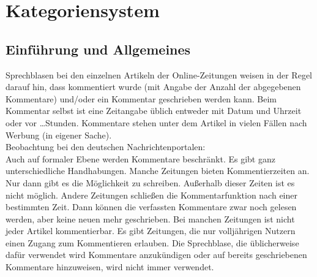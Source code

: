 \chapter{Kategoriensystem}


\section{Einführung und Allgemeines}

Sprechblasen bei den einzelnen Artikeln der Online-Zeitungen weisen in der Regel darauf hin, dass kommentiert wurde
(mit Angabe der Anzahl der abgegebenen Kommentare) und/oder ein Kommentar
geschrieben werden kann.  Beim Kommentar selbst ist eine Zeitangabe üblich
entweder mit Datum und Uhrzeit oder \glqq vor \ldots Stunden\grqq.  Kommentare
stehen unter dem Artikel in vielen Fällen nach Werbung (in eigener Sache).\\
Beobachtung bei den deutschen Nachrichtenportalen:\\
Auch auf formaler Ebene werden Kommentare beschränkt. Es gibt ganz
unterschiedliche Handhabungen. Manche Zeitungen bieten Kommentierzeiten an. Nur
dann gibt es die Möglichkeit zu schreiben. Außerhalb dieser Zeiten ist es nicht
möglich. Andere Zeitungen schließen die Kommentarfunktion nach einer bestimmten
Zeit. Dann können die verfassten Kommentare zwar noch gelesen werden, aber keine
neuen mehr geschrieben. Bei manchen Zeitungen ist nicht jeder Artikel
kommentierbar. Es gibt Zeitungen, die nur volljährigen Nutzern einen Zugang zum
Kommentieren erlauben.  Die Sprechblase, die üblicherweise dafür verwendet wird
Kommentare anzukündigen oder auf bereits geschriebenen Kommentare hinzuweisen,
wird nicht immer verwendet.

